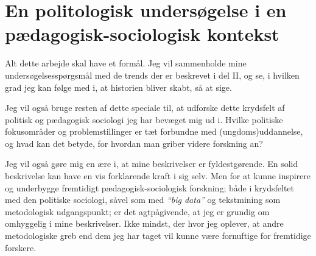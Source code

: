 \chapter{En politologisk undersøgelse i en pædagogisk-sociologisk kontekst}\label{chap:edusoc}

Alt dette arbejde skal have et formål.
Jeg vil sammenholde mine undersøgelsesspørgsmål med de trends der er beskrevet i del II, og se, i hvilken grad jeg kan følge med i, at historien bliver skabt, så at sige.

Jeg vil også bruge resten af dette speciale til, at udforske dette krydsfelt af politisk og pædagogisk sociologi jeg har bevæget mig ud i.
Hvilke politiske fokusområder og problemstillinger er tæt forbundne med (ungdoms)uddannelse, og hvad kan det betyde, for hvordan man griber videre forskning an?

Jeg vil også gøre mig en ære i, at mine beskrivelser er fyldestgørende.
En solid beskrivelse kan have en vis forklarende kraft i sig selv.
Men for at kunne inspirere og underbygge fremtidigt pædagogisk-sociologisk forskning; både i krydsfeltet med den politiske sociologi, såvel som med \textit{“big data”} og tekstmining som metodologisk udgangspunkt; er det agtpågivende, at jeg er grundig om omhyggelig i mine beskrivelser.
Ikke mindst, der hvor jeg oplever, at andre metodologiske greb end dem jeg har taget vil kunne være fornuftige for fremtidige forskere.

